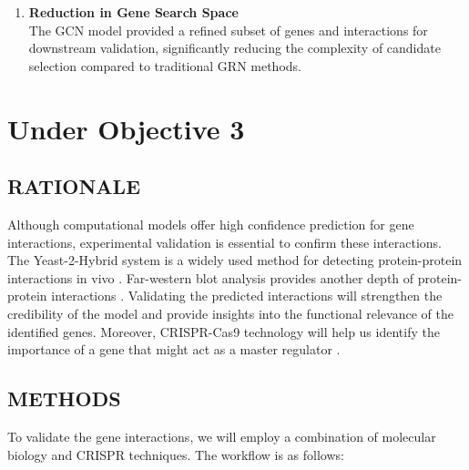 \documentclass{article}
\begin{document}
\begin{enumerate}
\begin{itemize}
        \item \textbf{Medicago truncatula Dataset:} \\
        Novel connections between early nodulin genes and stress-response genes suggest potential regulatory pathways involved in symbiotic nitrogen fixation, providing candidates for further study.

        \item \textbf{Sorghum Dataset:} \\
        A novel interaction between \texttt{DG(16:0)} and \texttt{TG(28:0)} underscores the role of triacylglycerol lipase in lipid conversion during stress, offering new insights into lipid-based stress adaptation mechanisms.
    \end{itemize}
    
    \item \textbf{Reduction in Gene Search Space} \\
    The GCN model provided a refined subset of genes and interactions for downstream validation, significantly reducing the complexity of candidate selection compared to traditional GRN methods.
\end{enumerate}

\section{Under Objective 3}
\subsection{RATIONALE}
Although computational models offer high confidence prediction for gene interactions, experimental validation is essential to confirm these interactions. The Yeast-2-Hybrid system is a widely used method for detecting protein-protein interactions in vivo \cite{lopez2017mapping}. Far-western blot analysis provides another depth of protein-protein interactions \cite{hall2004studying}. Validating the predicted interactions will strengthen the credibility of the model and provide insights into the functional relevance of the identified genes. Moreover, CRISPR-Cas9 technology will help us identify the importance of a gene that might act as a master regulator \cite{barrangou2015advances}.

\subsection{METHODS}

To validate the gene interactions, we will employ a combination of molecular biology and CRISPR techniques. The workflow is as follows:
\end{document}
